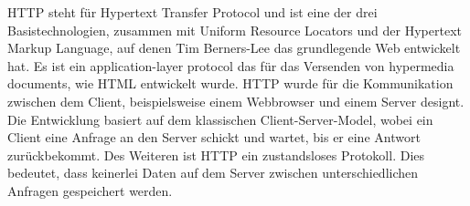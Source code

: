 HTTP steht für Hypertext Transfer Protocol und ist eine der drei Basistechnologien, zusammen mit Uniform Resource Locators und der Hypertext Markup Language, auf denen Tim Berners-Lee das grundlegende Web entwickelt hat. 
Es ist ein application-layer protocol das für das Versenden von hypermedia documents, wie HTML entwickelt wurde. HTTP wurde für die Kommunikation zwischen dem Client, beispielsweise einem Webbrowser und einem Server designt. Die Entwicklung basiert auf dem klassischen Client-Server-Model, wobei ein Client eine Anfrage an den Server schickt und wartet, bis er eine Antwort zurückbekommt. Des Weiteren ist HTTP ein zustandsloses Protokoll. Dies bedeutet, dass keinerlei Daten auf dem Server zwischen unterschiedlichen Anfragen gespeichert werden.
